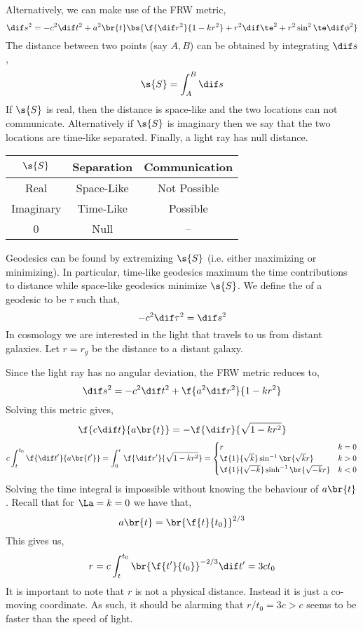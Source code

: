 \documentclass{article}
\begin{document}
Alternatively, we can make use of the FRW metric,
\[ \dif s^2 = - c^2 \dif t^2 + a^2\br{t} \bs{\f{\dif r^2}{1 - k r^2} + r^2 \dif \te^2 + r^2 \sin^2 \te \dif \phi^2} \]
The distance between two points (say $A,B$) can be obtained by integrating $\dif s$,
\[ \s{S} = \int_A^B \dif s \]
If $\s{S}$ is real, then the distance is space-like and the two locations can not communicate. Alternatively if $\s{S}$ is imaginary then we say that the two locations are time-like separated. Finally, a light ray has null distance.
\begin{center}
\begin{tabular}{|c|c|c|}
    \hline
    $\s{S}$ & Separation & Communication \\
    \hline
    Real & Space-Like & Not Possible \\
    Imaginary & Time-Like & Possible \\
    0 & Null & -- \\
    \hline
\end{tabular}
\end{center}
Geodesics can be found by extremizing $\s{S}$ (i.e. either maximizing or minimizing). In particular, time-like geodesics maximum the time contributions to distance while space-like geodesics minimize $\s{S}$. We define the  of a geodesic to be $\tau$ such that,
\[ -c^2 \dif \tau^2 = \dif s^2 \]
In cosmology we are interested in the light that travels to us from distant galaxies. Let $r=r_g$ be the distance to a distant galaxy.
\begin{center}
\end{center}
Since the light ray has no angular deviation, the FRW metric reduces to,
\[ \dif s^2 = - c^2 \dif t^2 + \f{a^2 \dif r^2}{1 - kr^2} \]
Solving this metric gives,
\[ \f{c \dif t}{a\br{t}} = - \f{\dif r}{\sqrt{1 - kr^2}} \]
\[ c\int_{t}^{t_0} \f{\dif t'}{a\br{t'}} = \int_{0}^{r} \f{\dif r'}{\sqrt{1 - kr^2}} = \begin{cases}
    r & k = 0 \\
    \f{1}{\sqrt{k}}\sin^{-1}\br{\sqrt{k}r} & k > 0\\
    \f{1}{\sqrt{-k}}\sinh^{-1}\br{\sqrt{-k}r} & k < 0\\
\end{cases} \]
Solving the time integral is impossible without knowing the behaviour of $a\br{t}$. Recall that for $\La = k = 0$ we have that,
\[ a\br{t} = \br{\f{t}{t_0}}^{2/3} \]
This gives us,
\[ r = c \int_{t}^{t_0} \br{\f{t'}{t_0}}^{-2/3} \dif t' = 3 c t_0 \]
It is important to note that $r$ is not a physical distance. Instead it is just a co-moving coordinate. As such, it should be alarming that $ r / t_0 = 3 c > c $ seems to be faster than the speed of light. \\
\end{document}
